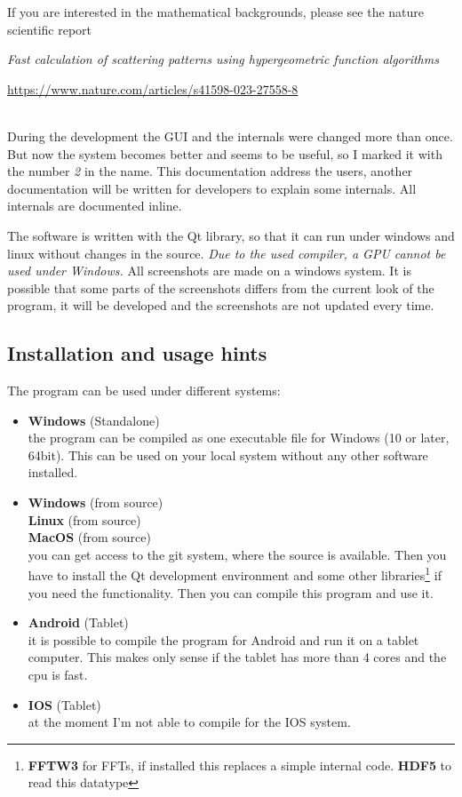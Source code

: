 \documentclass[11pt]{article} %
\begin{document}
If you are interested in the mathematical backgrounds, please see the nature scientific report \\
\centerline{\it Fast calculation of scattering patterns using hypergeometric function algorithms}
\centerline{\url{https://www.nature.com/articles/s41598-023-27558-8}} \\

During the development the GUI and the internals were changed more than once. But now the system becomes better and seems to be useful, so I marked it with the number {\it 2} in the name. This documentation address the users, another documentation will be written for developers to explain some internals. All internals are documented inline.

The software is written with the Qt library, so that it can run under windows and linux without changes in the source. {\it Due to the used compiler, a GPU cannot be used under Windows.} All screenshots are made on a windows system. It is possible that some parts of the screenshots differs from the current look of the program, it will be developed and the screenshots are not updated every time.

\subsection{Installation and usage hints}

The program can be used under different systems:
\begin{itemize}\itemsep0pt
\item {\bf Windows} (Standalone) \\
	the program can be compiled as one executable file for Windows (10 or later, 64bit). This can be used on your local system without any other software installed.
\item {\bf Windows} (from source) \\
	{\bf Linux} (from source) \\
	{\bf MacOS} (from source) \\
	you can get access to the git system, where the source is available. Then you have to install the Qt development environment and some other libraries\footnote{{\bf FFTW3} for FFTs, if installed this replaces a simple internal code. {\bf HDF5} to read this datatype} if you need the functionality. Then you can compile this program and use it.
\item {\bf Android} (Tablet) \\
	it is possible to compile the program for Android and run it on a tablet computer. This makes only sense if the tablet has more than 4 cores and the cpu is fast.
\item {\bf IOS} (Tablet) \\
	at the moment I'm not able to compile for the IOS system.
\end{itemize}
\end{document}
